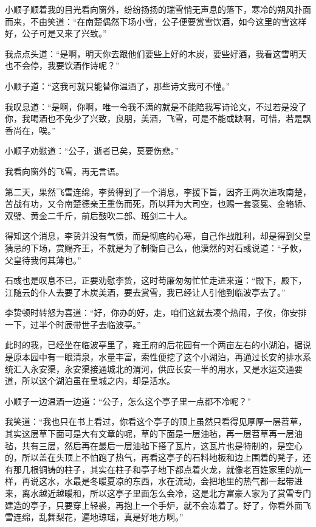 小顺子顺着我的目光看向窗外，纷纷扬扬的瑞雪悄无声息的落下，寒冷的朔风扑面而来，不由笑道：“在南楚偶然下场小雪，公子便要赏雪饮酒，如今这里的雪这样好，公子可是又来了兴致。”

我点点头道：“是啊，明天你去跟他们要些上好的木炭，要些好酒，我看这雪明天也不会停，我要饮酒作诗呢？”

小顺子道：“这我可就只能替你温酒了，那些诗文我可不懂。”

我叹息道：“是啊，你啊，唯一令我不满的就是不能陪我写诗论文，不过若是没了你，我喝酒也不免少了兴致，良朋，美酒，飞雪，可是不能或缺啊，可惜，若是飘香尚在，唉。”

小顺子劝慰道：“公子，逝者已矣，莫要伤悲。”

我看向窗外的飞雪，再无言语。

第二天，果然飞雪连绵，李贽得到了一个消息，李援下旨，因齐王两次进攻南楚，苦战有功，又令南楚德亲王重伤而死，所以拜为大司空，也赐一套衮冕、金辂轿、双璧、黄金二千斤，前后鼓吹二部、班剑二十人。

得知这个消息，李贽并没有气愤，而是彻底的心寒，自己作战胜利，却是得到父皇猜忌的下场，赏赐齐王，不就是为了制衡自己么，他漠然的对石彧说道：“子攸，父皇待我何其薄也。”

石彧也是叹息不已，正要劝慰李贽，这时苟廉匆匆忙忙走进来道：“殿下，殿下，江随云的仆人去要了木炭美酒，要去赏雪，我已经让人引他到临波亭去了。”

李贽顿时转怒为喜道：“好，你办的好，走，咱们这就去凑个热闹，子攸，你安排一下，过半个时辰带世子去临波亭。”

此时的我，已经坐在临波亭里了，雍王府的后花园有一个两亩左右的小湖泊，据说是原本园中有一眼清泉，水量丰富，索性便挖了这个小湖泊，再通过长安的排水系统汇入永安渠，永安渠接通城北的渭河，供应长安一半的用水，又是水运交通要道，所以这个湖泊虽在皇城之内，却是活水。

小顺子一边温酒一边道：“公子，怎么这个亭子里一点都不冷呢？”

我笑道：“我也只在书上看过，你看这个亭子的顶上虽然只看得见厚厚一层苕草，其实这层草下面可是大有文章的呢，草的下面是一层油毡，再一层苕草再一层油毡，共有三层，然后再在最后一层油毡下搭了瓦片，这瓦片也是特制的，是空心的，所以盖在头顶上不怕跑了热气，再看这亭子的石料地板和边上围着的凳子，还有那几根铜铸的柱子，其实在柱子和亭子地下都点着火龙，就像老百姓家里的炕一样，再说这水，水最是冬暖夏凉的东西，水在流动，会把地里的热气都一起带进来，离水越近越暖和，所以这亭子里面怎么会冷，这是北方富豪人家为了赏雪专门建造的亭子，只要穿上轻裘，再抱上一个手炉，就不会冻着了。好了，你看外面飞雪连绵，乱舞梨花，遍地琼瑶，真是好地方啊。”

